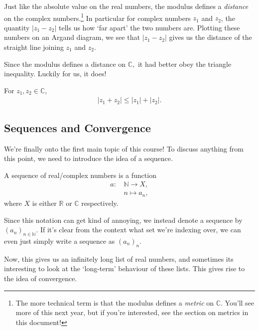 \documentclass[
  17pt,
  a4paper]{extarticle}
\theoremstyle{plain}
\theoremstyle{definition}
\theoremstyle{plain}
\theoremstyle{plain}
\theoremstyle{plain}
\theoremstyle{plain}
\theoremstyle{definition}
\theoremstyle{definition}
\theoremstyle{remark}
\theoremstyle{remark}
\let\BeginKnitrBlock\begin \let\EndKnitrBlock\end
\renewcommand{\;}{\,}
\begin{document}
Just like the absolute value on the real numbers, the modulus defines a \emph{distance} on the complex numbers.\footnote{The more technical term is that the modulus defines a \emph{metric} on \(\mathbb{C}.\) You'll see more of this next year, but if you're interested, see the section on metrics in this document!} In particular for complex numbers \(z_1\) and \(z_2\), the quantity \(\lvert z_1 - z_2 \rvert\) tells us how `far apart' the two numbers are. Plotting these numbers on an Argand diagram, we see that \(\lvert z_1 - z_2 \rvert\) gives us the distance of the straight line joining \(z_1\) and \(z_2.\)

Since the modulus defines a distance on \(\mathbb{C},\) it had better obey the triangle inequality. Luckily for us, it does!

\BeginKnitrBlock{proposition}[Triangle Inequality]
{\label{prp:prop3} }For \(z_1,z_2 \in \mathbb{C}\),
\begin{align*}
\lvert z_1 + z_2 \rvert \leq \lvert z_1 \rvert + \lvert z_2 \rvert.
\end{align*}
\EndKnitrBlock{proposition}

\hypertarget{sequences-and-convergence}{%
\subsection{Sequences and Convergence}\label{sequences-and-convergence}}

We're finally onto the first main topic of this course! To discuss anything from this point, we need to introduce the idea of a sequence.
\BeginKnitrBlock{definition}[Sequence]
{\label{def:def1} }A sequence of real/complex numbers is a function
\begin{align*}
    a:\; &\mathbb{N} \longrightarrow X,\\
    &n \longmapsto a_n,
\end{align*}
where \(X\) is either \(\mathbb{R}\) or \(\mathbb{C}\) respectively.
\EndKnitrBlock{definition}
Since this notation can get kind of annoying, we instead denote a sequence by \((a_n)_{n\in\mathbb{N}}\). If it's clear from the context what set we're indexing over, we can even just simply write a sequence as \((a_n)_n\).

Now, this gives us an infinitely long list of real numbers, and sometimes its interesting to look at the `long-term' behaviour of these lists. This gives rise to the idea of convergence.
\end{document}

